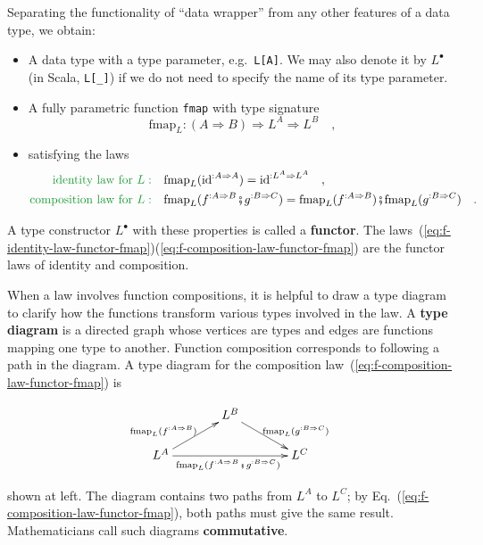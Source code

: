 Separating the functionality of ``data wrapper'' from any other
features of a data type, we obtain:
\begin{itemize}
\item A data type with a type parameter, e.g.~\lstinline!L[A]!. We may
also denote it by $L^{\bullet}$ (in Scala, \lstinline!L[_]!) if
we do not need to specify the name of its type parameter.
\item A fully parametric function \lstinline!fmap! with type signature
\[
\text{fmap}_{L}:\left(A\Rightarrow B\right)\Rightarrow L^{A}\Rightarrow L^{B}\quad,
\]
\item satisfying the laws
\begin{align}
{\color{greenunder}\text{identity law for }L:}\quad & \text{fmap}_{L}(\text{id}^{:A\Rightarrow A})=\text{id}^{:L^{A}\Rightarrow L^{A}}\quad,\label{eq:f-identity-law-functor-fmap}\\
{\color{greenunder}\text{composition law for }L:}\quad & \text{fmap}_{L}(f^{:A\Rightarrow B}\bef g^{:B\Rightarrow C})=\text{fmap}_{L}(f^{:A\Rightarrow B})\bef\text{fmap}_{L}(g^{:B\Rightarrow C})\quad.\label{eq:f-composition-law-functor-fmap}
\end{align}
\end{itemize}
A type constructor $L^{\bullet}$ with these properties is called
a \textbf{functor}. The laws~(\ref{eq:f-identity-law-functor-fmap})\textendash (\ref{eq:f-composition-law-functor-fmap})
are the functor laws of identity and composition. 

When a law involves function compositions, it is helpful to draw a
type diagram to clarify how the functions transform
various types involved in the law. A \textbf{type diagram}
is a directed graph whose vertices are types and edges are functions
mapping one type to another. Function composition corresponds to following
a path in the diagram. A type diagram for the composition law~(\ref{eq:f-composition-law-functor-fmap})
is\begin{wrapfigure}{l}{0.4\columnwidth}%
\vspace{-1.9\baselineskip}
\[
\xymatrix{\xyScaleY{1.5pc}\xyScaleX{3pc} & L^{B}\ar[rd]\sp(0.6){\ \text{fmap}_{L}(g^{:B\Rightarrow C})\ }\\
L^{A}\ar[ru]\sp(0.4){\text{fmap}_{L}(f^{:A\Rightarrow B})\ }\ar[rr]\sb(0.5){\text{fmap}_{L}(f^{:A\Rightarrow B}\bef g^{:B\Rightarrow C})\ } &  & L^{C}
}
\]

\vspace{-2\baselineskip}
\end{wrapfigure}%
shown at left. The diagram contains two paths from $L^{A}$ to $L^{C}$;
by Eq.~(\ref{eq:f-composition-law-functor-fmap}), both paths must
give the same result. Mathematicians call such diagrams \textbf{commutative}.

